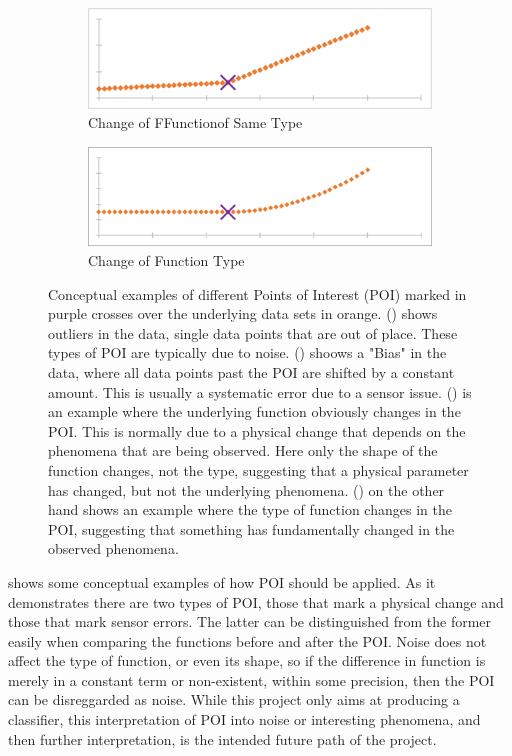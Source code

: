 \documentclass[main.tex]{subfiles}
\begin{document}
\begin{figure}[h]
        \begin{subfigure}{0.48\linewidth}
          \centering
          \includegraphics[width=0.9\linewidth]{figures/linearPOI}
          \caption{Change of FFunctionof Same Type}
          \label{fig:poi:linear}
        \end{subfigure}
        \begin{subfigure}{0.48\linewidth}
          \centering
          \includegraphics[width=0.9\linewidth]{figures/linSquPOI}
          \caption{Change of Function Type}
          \label{fig:poi:linSqu}
        \end{subfigure}
        \caption{Conceptual examples of different Points of Interest (POI) marked in purple crosses over the underlying data sets in orange. () shows outliers in the data, single data points that are out of place. These types of POI are typically due to noise. () shoows a "Bias" in the data, where all data points past the POI are shifted by a constant amount. This is usually a systematic error due to a sensor issue. () is an example where the underlying function obviously changes in the POI. This is normally due to a physical change that depends on the phenomena that are being observed. Here only the shape of the function changes, not the type, suggesting that a physical parameter has changed, but not the underlying phenomena. () on the other hand shows an example where the type of function changes in the POI, suggesting that something has fundamentally changed in the observed phenomena.}
        \label{fig:poi}
      \end{figure}
      
       shows some conceptual examples of how POI should be applied. As it demonstrates there are two types of POI, those that mark a physical change and those that mark sensor errors. The latter can be distinguished from the former easily when comparing the functions before and after the POI. Noise does not affect the type of function, or even its shape, so if the difference in function is merely in a constant term or non-existent, within some precision, then the POI can be disreggarded as noise. While this project only aims at producing a classifier, this interpretation of POI into noise or interesting phenomena, and then further interpretation, is the intended future path of the project.
      
\end{document}
